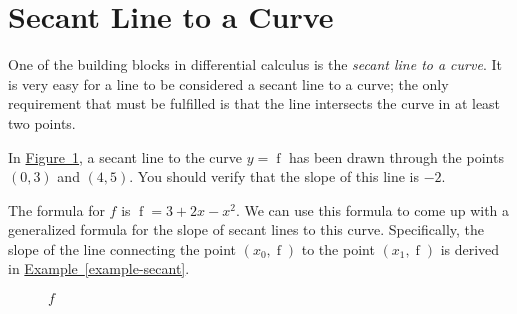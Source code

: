\documentclass[12pt,]{book}
\theoremstyle{plain}
\theoremstyle{definition}
\numberwithin{equation}{section}
\newcommand{\fe}[2]{\mathop{{#1}{\left(#2\right)}}}
\newcommand{\point}[2]{\left(#1,#2\right)}
\begin{document}
\section[Secant Line to a Curve]{Secant Line to a Curve}\label{section-secant}
One of the building blocks in differential calculus is the \emph{secant line to a curve}. It is very easy for a line to be considered a secant line to a curve; the only requirement that must be fulfilled is that the line intersects the curve in at least two points.%
\begin{multicols}{2}
\par
In \hyperref[figure-secant]{Figure~\ref*{figure-secant}}, a secant line to the curve \(y=\fe{f}{x}\) has been drawn through the points \(\point{0}{3}\) and \(\point{4}{5}\). You should verify that the slope of this line is \(-2\).%
\par
The formula for \(f\) is \(\fe{f}{x}=3+2x-x^2\). We can use this formula to come up with a generalized formula for the slope of secant lines to this curve. Specifically, the slope of the line connecting the point \(\point{x_0}{\fe{f}{x_0}}\) to the point \(\point{x_1}{\fe{f}{x_1}}\) is derived in \hyperref[example-secant]{Example~\ref*{example-secant}}.%
\begin{figure}
\centering
{
}
\caption{\(f\)\label{figure-secant}}
\end{figure}
\end{multicols}%
\end{document}
